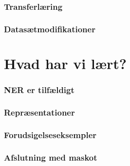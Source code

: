 \documentclass{beamer}
\begin{document}
\begin{frame}
    \frametitle{Transferlæring}
\end{frame}

\begin{frame}
    \frametitle{Datasætmodifikationer}
\end{frame}

\section{Hvad har vi lært?}

\begin{frame}
    \frametitle{NER er tilfældigt}
\end{frame}

\begin{frame}
    \frametitle{Repræsentationer}
\end{frame}

\begin{frame}
    \frametitle{Forudsigelseseksempler}
\end{frame}

\begin{frame}
    \frametitle{Afslutning med maskot}
\end{frame}
\end{document}

